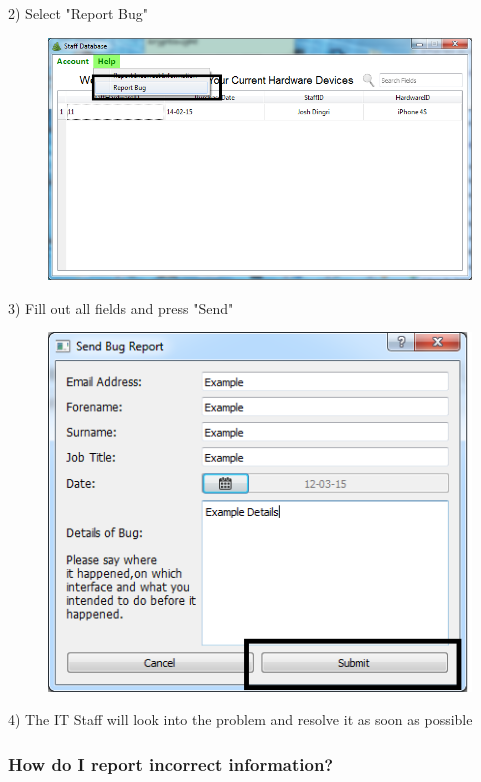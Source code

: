 2) Select "Report Bug"


\begin{figure}[H]
    \includegraphics[width=\textwidth]{./Manual/Images/bugreport2.png}
\end{figure}


3) Fill out all fields and press "Send"


\begin{figure}[H]
    \includegraphics[width=\textwidth]{./Manual/Images/bugreport3.png}
\end{figure}


4) The IT Staff will look into the problem and resolve it as soon as possible

\subsubsection{How do I report incorrect information?}\label{incorrectinfo}

